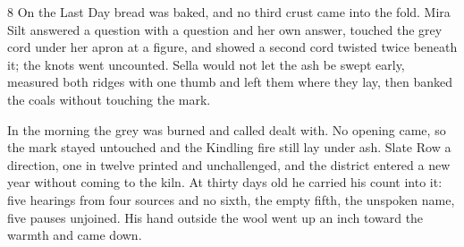 \begin{CRchronicle}{8}
On the Last Day bread was baked, and no third crust came into the fold. Mira Silt answered a question with a question and her own answer, touched the grey cord under her apron at a figure, and showed a second cord twisted twice beneath it; the knots went uncounted. Sella would not let the ash be swept early, measured both ridges with one thumb and left them where they lay, then banked the coals without touching the mark.

In the morning the grey was burned and called dealt with. No opening came, so the mark stayed untouched and the Kindling fire still lay under ash. Slate Row a direction, one in twelve printed and unchallenged, and the district entered a new year without coming to the kiln. At thirty days old he carried his count into it: five hearings from four sources and no sixth, the empty fifth, the unspoken name, five pauses unjoined. His hand outside the wool went up an inch toward the warmth and came down.
\end{CRchronicle}
